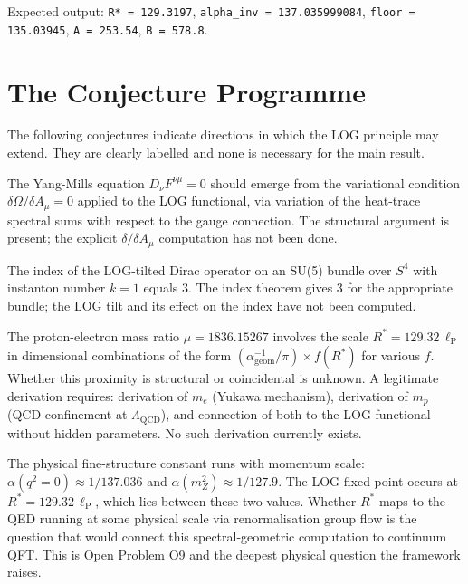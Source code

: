 \documentclass[12pt,a4paper]{article}
\newcommand{\lP}{\ell_{\mathrm{P}}}
\newcommand{\ai}{\alpha^{-1}}
\newcommand{\Om}{\Omega}
\newcommand{\floor}{\ai_{\mathrm{geom}}}
\begin{document}
\noindent Expected output:
\texttt{R* = 129.3197},\;
\texttt{alpha\_inv = 137.035999084},\;
\texttt{floor = 135.03945},\;
\texttt{A = 253.54},\;
\texttt{B = 578.8}.

\section{The Conjecture Programme}
\label{sec:beyond}

The following conjectures indicate directions in
which the LOG principle may extend.
They are clearly labelled and none is necessary
for the main result.

\begin{Cbox}[Yang-Mills from $\delta\Om/\delta A = 0$ (O4)]
The Yang-Mills equation $D_\nu F^{\nu\mu} = 0$
should emerge from the variational condition
$\delta\Om/\delta A_\mu = 0$ applied to the
LOG functional, via variation of the heat-trace
spectral sums with respect to the gauge connection.
The structural argument is present; the explicit
$\delta/\delta A_\mu$ computation has not been done.
\end{Cbox}

\begin{Cbox}
The index of the LOG-tilted Dirac operator
on an SU(5) bundle over $S^4$ with instanton
number $k=1$ equals 3.
The index theorem gives 3 for the appropriate bundle;
the LOG tilt and its effect on the index have not
been computed.
\end{Cbox}

\begin{Sbox}
The proton-electron mass ratio $\mu = 1836.15267$
involves the scale $R^* = 129.32\,\lP$ in dimensional
combinations of the form
$(\floor/\pi) \times f(R^*)$ for various $f$.
Whether this proximity is structural or coincidental
is unknown.
A legitimate derivation requires:
derivation of $m_e$ (Yukawa mechanism),
derivation of $m_p$ (QCD confinement at $\Lambda_{\mathrm{QCD}}$),
and connection of both to the LOG functional
without hidden parameters.
No such derivation currently exists.
\end{Sbox}

\begin{Sbox}
The physical fine-structure constant runs with
momentum scale: $\alpha(q^2 = 0) \approx 1/137.036$
and $\alpha(m_Z^2) \approx 1/127.9$.
The LOG fixed point occurs at $R^* = 129.32\,\lP$,
which lies between these two values.
Whether $R^*$ maps to the QED running at some
physical scale via renormalisation group flow
is the question that would connect this
spectral-geometric computation to continuum QFT.
This is Open Problem O9 and the deepest
physical question the framework raises.
\end{Sbox}
\end{document}
